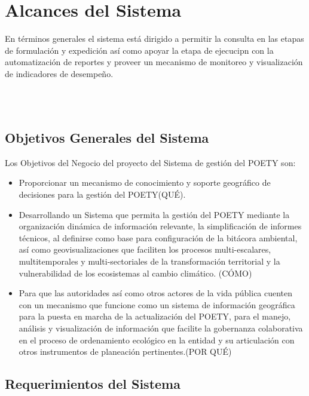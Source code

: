 
\section{Alcances del Sistema}
En términos generales el sistema está dirigido a permitir la consulta en las etapas de formulación y expedición así como  apoyar la etapa de ejecucipn con la automatización de reportes y  proveer un mecanismo de monitoreo y visualización de indicadores de desempeño. 

\\
\\
\subsection{Objetivos Generales del Sistema}

Los Objetivos del Negocio del proyecto del Sistema de gestión del POETY son:
\begin{itemize}
\item Proporcionar un mecanismo de conocimiento y soporte geográfico de decisiones para la gestión del POETY(QUÉ).
\item Desarrollando un Sistema que permita la gestión del POETY mediante la organización dinámica de información relevante, la simplificación de informes técnicos, al definirse como base para configuración de la bitácora ambiental, así como geovisualizaciones que faciliten los procesos multi-escalares, multitemporales y multi-sectoriales de la transformación territorial y la vulnerabilidad de los ecosistemas al cambio climático. (CÓMO)
\item Para que las autoridades así como otros actores de la vida pública cuenten con un mecanismo que funcione como un sistema de información geográfica para la puesta en marcha de la actualización del POETY, para el manejo, análisis y visualización de información que facilite la gobernanza colaborativa en el proceso de ordenamiento ecológico en la entidad y su articulación con otros instrumentos de planeación pertinentes.(POR QUÉ)
\end{itemize}

\pagebreak
\subsection{Requerimientos del Sistema}


